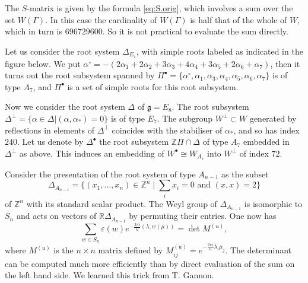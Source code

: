 \documentclass[12pt]{amsart}
\theoremstyle{plain}
\theoremstyle{definition}
\numberwithin{equation}{section}
\newcommand{\al}{\alpha}
\newcommand{\la}{\lambda}
\newcommand{\D}{\Delta}
\newcommand{\R}{\mathbb{R}}
\newcommand{\Z}{\mathbb{Z}}
\newcommand{\g}{\mathfrak{g}}
\newcommand{\alstar}{{\alpha_*}}
\begin{document}
The $S$-matrix is given by the formula \eqref{eq:S.orig}, which involves a sum over the set  $W(\Gamma)$. In this case the cardinality of $W(\Gamma)$ is half that of the whole of $W$, which in turn is $696729600$. So it is not practical to evaluate the sum directly.


Let us consider the root system $\D_{E_7}$, with simple roots labeled as indicated in the figure below. We put $\al^\circ = -(2\al_1+2\al_2+3\al_3+4\al_4+3\al_5+2\al_6+\al_7)$, then it turns out the root subsystem spanned by $\Pi^\bullet = \{\al^\circ, \al_1, \al_3, \al_4, \al_5, \al_6, \al_7\}$ is of type $A_7$, and $\Pi^\bullet$ is a set of simple roots for this root subsystem.
\begin{center}
\end{center}
Now we consider the root system $\D$ of $\g = E_8$. The root subsystem $\D^\perp = \{\al \in \D | (\al, \alstar) = 0\}$ is of type $E_7$. The subgroup $W^\perp \subset W$ generated by reflections in elements of $\D^\perp$ coincides with the stabiliser of $\alstar$, and so has index $240$. Let us denote by $\D^\bullet$ the root subsystem $\Z\Pi \cap \D$ of type $A_7$ embedded in $\D^\perp$ as above. This induces an embedding of $W^\bullet \cong W_{A_7}$ into $W^\perp$ of index $72$.






Consider the presentation of the root system of type $A_{n-1}$ as the subset
\[
\D_{A_{n-1}} = \{(x_1,\ldots, x_{n}) \in \Z^{n} \mid \text{$\sum_i x_i = 0$ and $(x, x)=2$}\}
\]
of $\Z^{n}$ with its standard scalar product. The Weyl group of $\D_{A_{n-1}}$ is isomorphic to $S_{n}$ and acts on vectors of $\R \D_{A_{n-1}}$ by permuting their entries. One now has
\[
\sum_{w \in S_n} \varepsilon(w) e^{-\frac{2\pi i}{u} (\la, w(\mu))} = \det{M^{(u)}},
\]
where $M^{(u)}$ is the $n \times n$ matrix defined by $M_{ij}^{(u)} = e^{-\frac{2\pi i}{u} \la_i \mu_j}$. The determinant can be computed much more efficiently than by direct evaluation of the sum on the left hand side. We learned this trick from T. Gannon.
\end{document}
